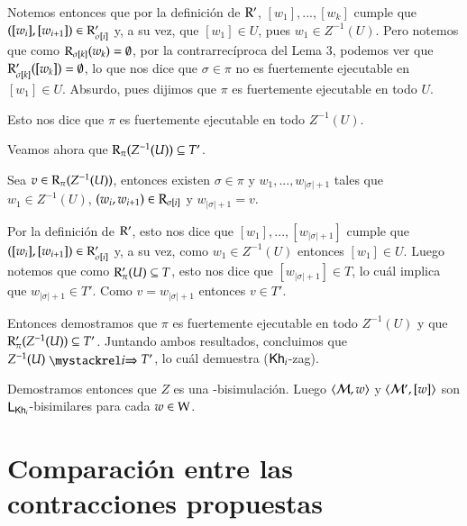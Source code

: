 \begin{demostracion}
\begin{itemize}
        Notemos entonces que por la definición de $\mathrm{R}'$, $[w_1],...,[w_k]$ cumple que $([w_i],[w_{i+1}]) \in \mathrm{R}'_{\sigma[i]}$ y, a su vez, que $[w_1] \in U$, pues $w_1 \in Z^{-1}(U)$. Pero notemos que como $\mathrm{R}_{\sigma[k]}(w_k) = \emptyset$, por la contrarrecíproca del Lema 3, podemos ver que $\mathrm{R}'_{\sigma[k]}([w_k]) = \emptyset$, lo que nos dice que $\sigma \in \pi$ no es fuertemente ejecutable en $[w_1] \in U$. Absurdo, pues dijimos que $\pi$ es fuertemente ejecutable en todo $U$.

        Esto nos dice que $\pi$ es fuertemente ejecutable en todo $Z^{-1}(U)$.

        Veamos ahora que $\mathrm{R}_\pi(Z^{-1}(U)) \subseteq T'$.

        Sea $v \in \mathrm{R}_\pi(Z^{-1}(U))$, entonces existen $\sigma \in \pi$ y $w_1,...,w_{|\sigma|+1}$ tales que $w_1 \in Z^{-1}(U)$, $(w_i,w_{i+1}) \in \mathrm{R}_{\sigma[i]}$ y $w_{|\sigma|+1} = v$. 

        Por la definición de $\mathrm{R}'$, esto nos dice que $[w_1],...,[w_{|\sigma|+1}]$ cumple que $([w_i],[w_{i+1}]) \in \mathrm{R}'_{\sigma[i]}$ y, a su vez, como $w_1 \in Z^{-1}(U)$ entonces $[w_1] \in U$. Luego notemos que como $\mathrm{R}'_\pi(U) \subseteq T$, esto nos dice que $[w_{|\sigma|+1}] \in T$, lo cuál implica que $w_{|\sigma|+1} \in T'$. Como $v = w_{|\sigma|+1}$ entonces $v \in T'$. 

        Entonces demostramos que $\pi$ es fuertemente ejecutable en todo $Z^{-1}(U)$ y que $\mathrm{R}'_\pi(Z^{-1}(U)) \subseteq T'$. Juntando ambos resultados, concluimos que $Z^{-1}(U) \ultsExecAgi T'$, lo cuál demuestra ($\mathsf{Kh}_i$-zag).
    \end{itemize}
    Demostramos entonces que $Z$ es una \KHilogic-bisimulación. Luego $\langle \mathcal{M},w \rangle$ y $\langle \mathcal{M}',[w] \rangle$ son $\mathsf{L}_{\mathsf{Kh}_i}$-bisimilares para cada $w \in \mathrm{W}$.
\end{demostracion}

\section{Comparación entre las contracciones propuestas}
